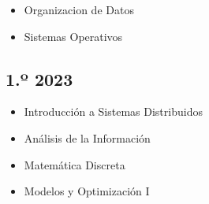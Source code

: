 \documentclass[
]{article}
\providecommand{\tightlist}{%
  \setlength{\itemsep}{0pt}\setlength{\parskip}{0pt}}
\begin{document}
\begin{itemize}
\tightlist
\item
  Organizacion de Datos
\item
  Sistemas Operativos
\end{itemize}

\hypertarget{uxba-2023}{%
\subsection{1.º 2023}\label{uxba-2023}}

\begin{itemize}
\tightlist
\item
  Introducción a Sistemas Distribuidos
\item
  Análisis de la Información
\item
  Matemática Discreta
\item
  Modelos y Optimización I
\end{itemize}
\end{document}
